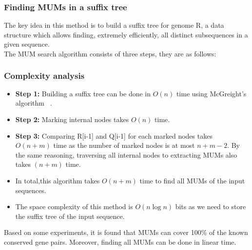 \documentclass[twocolumn,twoside]{Jornadas}
\begin{document}
\subsubsection{Finding MUMs in a suffix tree} 
The key idea in this method is to build a suffix tree for genome R, a data structure which allows finding, extremely efficiently, all distinct subsequences in a given sequence.\\
The MUM search algorithm consists of three steps, they are as follows:
\begin{algorithmic}
  \ENDIF
  \ENDFOR
\end{algorithmic}
\subsubsection{Complexity analysis} 
\begin{itemize}
  \item \textbf{Step 1:} Building a suffix tree can be done in $O(n)$ time using McGreight's algorithm ~\cite{McCreight:1976:SST:321941.321946}.
  \item \textbf{Step 2:} Marking internal nodes takes $O(n)$ time. 
  \item \textbf{Step 3:} Comparing R[i-1] and Q[i-1] for each marked nodes takes $O(n+m)$ time as the number of marked nodes is at most $n+m-2$. By the same reasoning, traversing all internal nodes to extracting MUMs also takes $(n+m)$ time.
  \item In total,this algorithm takes $O(n+m)$ time to find all MUMs of the input sequences.
  \item The space complexity of this method is $O\left(n\log n\right)$ bits as we need to store the suffix tree of the input sequence.
\end{itemize}
Based on some experiments, it is found that MUMs can cover 100\% of the known conserved gene pairs. Moreover, finding all MUMs can be done in linear time.
\end{document}
